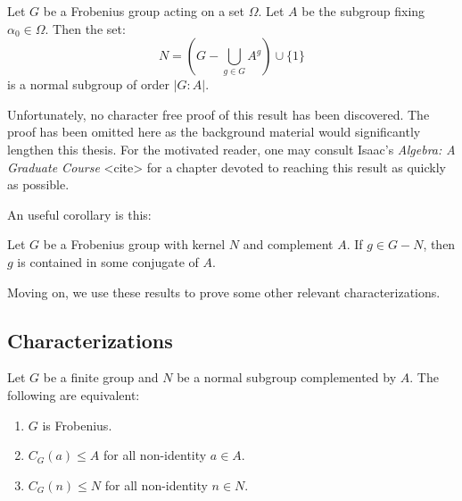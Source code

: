 \documentclass[main.tex]{subfiles}
\begin{document}
\begin{theorem}[Frobenius]
Let $G$ be a Frobenius group acting on a set $\Omega$. Let $A$ be the subgroup fixing $\alpha_0 \in \Omega$. Then the set:
$$N = (G - \bigcup_{g \in G} A^g) \cup \{1\}$$
is a normal subgroup of order $|G : A|$.
\end{theorem}

Unfortunately, no character free proof of this result has been discovered. The proof has been omitted here as the background material would significantly lengthen this thesis. For the motivated reader, one may consult Isaac's \emph{Algebra: A Graduate Course} <cite> for a chapter devoted to reaching this result as quickly as possible.

An useful corollary is this:

\begin{corollary}\label{frobeniuscorollary}
Let $G$ be a Frobenius group with kernel $N$ and complement $A$. If $g \in G - N$, then $g$ is contained in some conjugate of $A$.
\end{corollary}

Moving on, we use these results to prove some other relevant characterizations.

\hss

\subsection{Characterizations}

\hss

\begin{lemma}\label{frobeniuscentralizers}
Let $G$ be a finite group and $N$ be a normal subgroup complemented by $A$. The following are equivalent:
\begin{enumerate}
	\item $G$ is Frobenius.
	\item $C_G(a) \le A$ for all non-identity $a \in A$.
	\item $C_G(n) \le N$ for all non-identity $n \in N$.
\end{enumerate}
\end{lemma}
\end{document}

